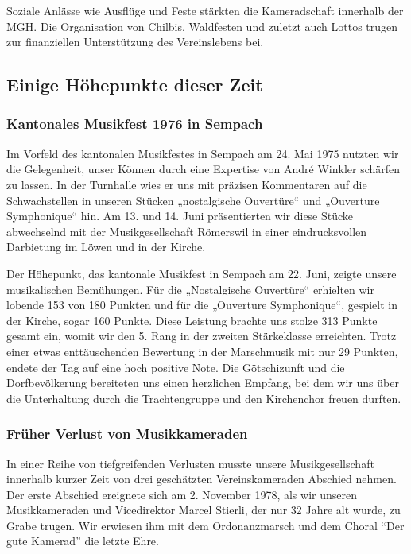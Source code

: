 \begin{history}
    Soziale Anlässe wie Ausflüge und Feste stärkten die Kameradschaft innerhalb
    der MGH. Die Organisation von Chilbis, Waldfesten und zuletzt auch Lottos
    trugen zur finanziellen Unterstützung des Vereinslebens bei.

    \subsection{Einige Höhepunkte dieser Zeit}

    \subsubsection{Kantonales Musikfest 1976 in Sempach}

    Im Vorfeld des kantonalen Musikfestes in Sempach am 24. Mai 1975 nutzten wir
    die Gelegenheit, unser Können durch eine Expertise von André Winkler
    schärfen zu lassen. In der Turnhalle wies er uns mit präzisen Kommentaren
    auf die Schwachstellen in unseren Stücken „nostalgische Ouvertüre“ und
    „Ouverture Symphonique“ hin. Am 13. und 14. Juni präsentierten wir diese
    Stücke abwechselnd mit der Musikgesellschaft Römerswil in einer
    eindrucksvollen Darbietung im Löwen und in der Kirche.

    Der Höhepunkt, das kantonale Musikfest in Sempach am 22. Juni, zeigte unsere
    musikalischen Bemühungen. Für die „Nostalgische Ouvertüre“ erhielten wir
    lobende 153 von 180 Punkten und für die „Ouverture Symphonique“, gespielt in
    der Kirche, sogar 160 Punkte. Diese Leistung brachte uns stolze 313 Punkte
    gesamt ein, womit wir den 5. Rang in der zweiten Stärkeklasse erreichten.
    Trotz einer etwas enttäuschenden Bewertung in der Marschmusik mit nur 29
    Punkten, endete der Tag auf eine hoch positive Note. Die Götschizunft und
    die Dorfbevölkerung bereiteten uns einen herzlichen Empfang, bei dem wir uns
    über die Unterhaltung durch die Trachtengruppe und den Kirchenchor freuen
    durften.

    \subsubsection{Früher Verlust von Musikkameraden}
    In einer Reihe von tiefgreifenden Verlusten musste unsere Musikgesellschaft
    innerhalb kurzer Zeit von drei geschätzten Vereinskameraden Abschied nehmen.
    Der erste Abschied ereignete sich am 2. November 1978, als wir unseren
    Musikkameraden und Vicedirektor Marcel Stierli, der nur 32 Jahre alt wurde,
    zu Grabe trugen. Wir erwiesen ihm mit dem Ordonanzmarsch und dem Choral
    \enquote{Der gute Kamerad} die letzte Ehre.


\end{history}
